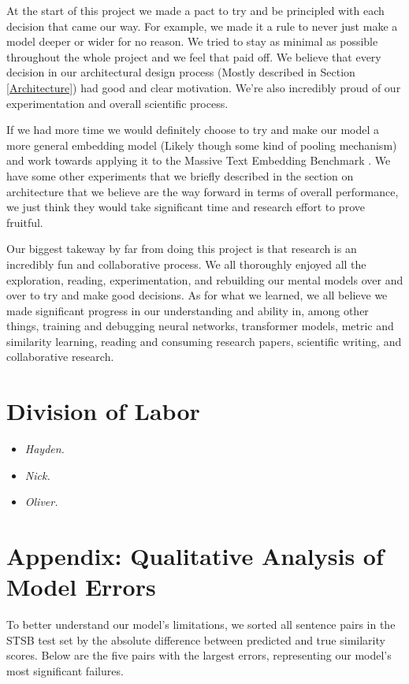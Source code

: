 \documentclass{article}
\begin{document}
At the start of this project we made a pact to try and be principled with each decision that came our way. For example, we made it a rule to never just make a model deeper or wider for no reason. We tried to stay as minimal as possible throughout the whole project and we feel that paid off. We believe that every decision in our architectural design process (Mostly described in Section \ref{Architecture}) had good and clear motivation. We're also incredibly proud of our experimentation and overall scientific process.

If we had more time we would definitely choose to try and make our model a more general embedding model (Likely though some kind of pooling mechanism) and work towards applying it to the Massive Text Embedding Benchmark \cite{muennighoff2022mteb}. We have some other experiments that we briefly described in the section on architecture that we believe are the way forward in terms of overall performance, we just think they would take significant time and research effort to prove fruitful.

Our biggest takeway by far from doing this project is that research is an incredibly fun and collaborative process. We all thoroughly enjoyed all the exploration, reading, experimentation, and rebuilding our mental models over and over to try and make good decisions. As for what we learned, we all believe we made significant progress in our understanding and ability in, among other things, training and debugging neural networks, transformer models, metric and similarity learning, reading and consuming research papers, scientific writing, and collaborative research.

\section{Division of Labor}
\begin{itemize}
    \item \textit{Hayden.}
    \item \textit{Nick.} 
    \item \textit{Oliver.} 
\end{itemize}

\newpage
\section{Appendix: Qualitative Analysis of Model Errors} \label{error analysis}
To better understand our model's limitations, we sorted all sentence pairs in the STSB test set by the absolute difference between predicted and true similarity scores. Below are the five pairs with the largest errors, representing our model's most significant failures.
\end{document}
